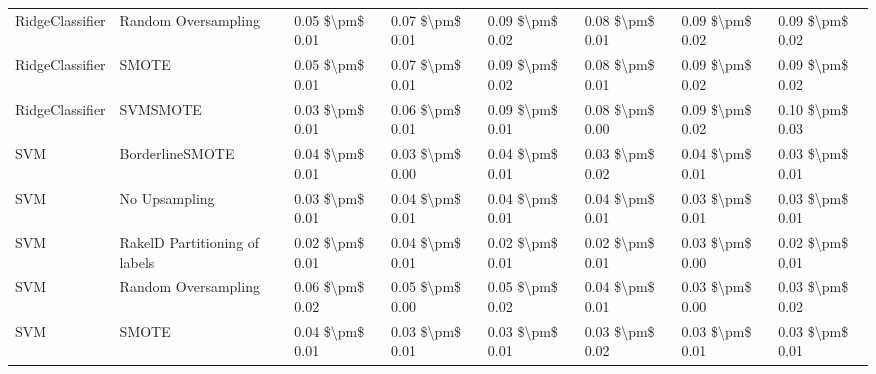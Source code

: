 \begin{tabular}{llllllll}
                RidgeClassifier &           Random Oversampling & 0.05 \$\textbackslash pm\$ 0.01 &           0.07 \$\textbackslash pm\$ 0.01 &       0.09 \$\textbackslash pm\$ 0.02 &        0.08 \$\textbackslash pm\$ 0.01 &                         0.09 \$\textbackslash pm\$ 0.02 & 0.09 \$\textbackslash pm\$ 0.02 \\
                RidgeClassifier &                         SMOTE & 0.05 \$\textbackslash pm\$ 0.01 &           0.07 \$\textbackslash pm\$ 0.01 &       0.09 \$\textbackslash pm\$ 0.02 &        0.08 \$\textbackslash pm\$ 0.01 &                         0.09 \$\textbackslash pm\$ 0.02 & 0.09 \$\textbackslash pm\$ 0.02 \\
                RidgeClassifier &                      SVMSMOTE & 0.03 \$\textbackslash pm\$ 0.01 &           0.06 \$\textbackslash pm\$ 0.01 &       0.09 \$\textbackslash pm\$ 0.01 &        0.08 \$\textbackslash pm\$ 0.00 &                         0.09 \$\textbackslash pm\$ 0.02 & 0.10 \$\textbackslash pm\$ 0.03 \\
                            SVM &               BorderlineSMOTE & 0.04 \$\textbackslash pm\$ 0.01 &           0.03 \$\textbackslash pm\$ 0.00 &       0.04 \$\textbackslash pm\$ 0.01 &        0.03 \$\textbackslash pm\$ 0.02 &                         0.04 \$\textbackslash pm\$ 0.01 & 0.03 \$\textbackslash pm\$ 0.01 \\
                            SVM &                 No Upsampling & 0.03 \$\textbackslash pm\$ 0.01 &           0.04 \$\textbackslash pm\$ 0.01 &       0.04 \$\textbackslash pm\$ 0.01 &        0.04 \$\textbackslash pm\$ 0.01 &                         0.03 \$\textbackslash pm\$ 0.01 & 0.03 \$\textbackslash pm\$ 0.01 \\
                            SVM & RakelD Partitioning of labels & 0.02 \$\textbackslash pm\$ 0.01 &           0.04 \$\textbackslash pm\$ 0.01 &       0.02 \$\textbackslash pm\$ 0.01 &        0.02 \$\textbackslash pm\$ 0.01 &                         0.03 \$\textbackslash pm\$ 0.00 & 0.02 \$\textbackslash pm\$ 0.01 \\
                            SVM &           Random Oversampling & 0.06 \$\textbackslash pm\$ 0.02 &           0.05 \$\textbackslash pm\$ 0.00 &       0.05 \$\textbackslash pm\$ 0.02 &        0.04 \$\textbackslash pm\$ 0.01 &                         0.03 \$\textbackslash pm\$ 0.00 & 0.03 \$\textbackslash pm\$ 0.02 \\
                            SVM &                         SMOTE & 0.04 \$\textbackslash pm\$ 0.01 &           0.03 \$\textbackslash pm\$ 0.01 &       0.03 \$\textbackslash pm\$ 0.01 &        0.03 \$\textbackslash pm\$ 0.02 &                         0.03 \$\textbackslash pm\$ 0.01 & 0.03 \$\textbackslash pm\$ 0.01 \\

\end{tabular}
